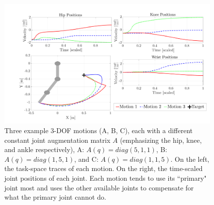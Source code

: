 \documentclass[letterpaper, 10 pt, conference,fleqn]{ieeeconf}
\begin{document}
\begin{figure}[t]
\centering
\includegraphics[width=\linewidth]{Pic/A_comparison_positions.pdf}
\caption{Three example 3-DOF motions (A, B, C), each with a different constant joint augmentation matrix $A$ (emphasizing the hip, knee, and ankle respectively), A: $A(q)=diag(5,1,1) $, B: $A(q)=diag(1,5,1)$, and C: $A(q)=diag(1,1,5)$. On the left, the task-space traces of each motion. On the right, the time-scaled joint positions of each joint. Each motion tends to use its ``primary" joint most and uses the other available joints to compensate for what the primary joint cannot do.}
\label{fig:A_example}
\vspace{-15pt}
\end{figure}
\end{document}
